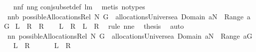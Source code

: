 \begin{isabellebody}
\isadelimproof
\ %
\endisadelimproof
%
\isatagproof
{}\isamarkupfalse%
\ nn{}{}f\ nn{}{}g\isanewline
conj{\isacharunderscore}subset{\isacharunderscore}def\ lm{}{}\ \isamarkupfalse%
\ {\isacharparenleft}metis\ {\isacharparenleft}no{\isacharunderscore}types{\isacharparenright}{\isacharparenright}%
\endisatagproof
{\isafoldproof}%
%
\isadelimproof
%
\endisadelimproof
\isanewline
\isanewline
{}\isamarkupfalse%
\ nn{}{}b{\isacharcolon}\ {\isachardoublequoteopen}possibleAllocationsRel\ N\ G\ {\isasymsubseteq}\ allocationsUniverse{\isasyminter}{\isacharbraceleft}a{\isachardot}\ Domain\ a{\isasymsubseteq}N\ {\isacharampersand}\ {\isasymUnion}Range\ a{\isacharequal}G{\isacharbraceright}{\isachardoublequoteclose}\isanewline
{\isacharparenleft}\ {\isachardoublequoteopen}{\isacharquery}L\ {\isasymsubseteq}\ {\isacharquery}R{}\ {\isasyminter}\ {\isacharquery}R{}{\isachardoublequoteclose}{\isacharparenright}\isanewline
%
\isadelimproof
%
\endisadelimproof
%
\isatagproof
{}\isamarkupfalse%
\ {\isacharminus}\ \isamarkupfalse%
\ {\isachardoublequoteopen}{\isacharquery}L\ {\isasymsubseteq}\ {\isacharquery}R{}\ {\isacharampersand}\ {\isacharquery}L\ {\isasymsubseteq}\ {\isacharquery}R{}{\isachardoublequoteclose}\ \isamarkupfalse%
\ {\isacharparenleft}rule\ nn{}{}e{\isacharparenright}\ \isamarkupfalse%
\ {\isacharquery}thesis\ \isamarkupfalse%
\ auto\ \isamarkupfalse%
%
\endisatagproof
{\isafoldproof}%
%
\isadelimproof
\isanewline
%
\endisadelimproof
\isanewline
{}\isamarkupfalse%
\ nn{}{}{\isacharcolon}\ {\isachardoublequoteopen}possibleAllocationsRel\ N\ G\ {\isacharequal}\ {\isacharparenleft}allocationsUniverse{\isasyminter}{\isacharbraceleft}a{\isachardot}\ Domain\ a{\isasymsubseteq}N\ {\isacharampersand}\ {\isasymUnion}Range\ a{\isacharequal}G{\isacharbraceright}{\isacharparenright}{\isachardoublequoteclose}\ \isanewline
{\isacharparenleft}\ {\isachardoublequoteopen}{\isacharquery}L\ {\isacharequal}\ {\isacharquery}R{\isachardoublequoteclose}{\isacharparenright}\ \isanewline
%
\isadelimproof
%
\endisadelimproof
%
\isatagproof
{}\isamarkupfalse%
\ {\isacharminus}\isanewline
\ \ \isamarkupfalse%
\ {\isachardoublequoteopen}{\isacharquery}L\ {\isasymsubseteq}\ {\isacharquery}R{\isachardoublequoteclose}\ \isamarkupfalse%

\end{isabellebody}

